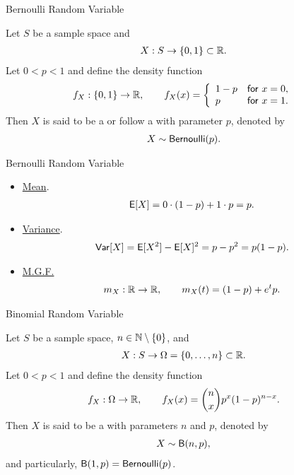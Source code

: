 \begin{frame}{Bernoulli Random Variable}

\justifying
{} Let $S$ be a sample space and 
\begin{align*}
X: S \rightarrow \{0, 1\} \subset \mathbb{R}.
\end{align*}
Let $0 < p < 1$ and define the density function
\begin{align*}
f_X: \{0, 1\} \rightarrow \mathbb{R}, \qquad f_X(x) = \left\{
\begin{array}{ll}
1 - p & \mathsf{for\ } x = 0, \\
p & \mathsf{for\ } x = 1.
\end{array}
\right.
\end{align*}
Then $X$ is said to be a  or follow a  with parameter $p$, denoted by
\begin{align*}
X\sim \mathsf{Bernoulli}(p).
\end{align*}

\end{frame}

\begin{frame}{Bernoulli Random Variable}

\justifying
{}
\begin{itemize}
	\justifying
	\item \underline{Mean}.
	\begin{align*}
	\mathsf{E}[X] = 0\cdot (1-p) + 1\cdot p = p.
	\end{align*}
	\item \underline{Variance}.
	\begin{align*}
	\mathsf{Var}[X] = \mathsf{E}[X^2] - \mathsf{E}[X]^2 = p - p^2 = p(1-p).
	\end{align*}
	\item \underline{M.G.F.}
	\begin{align*}
	m_X: \mathbb{R}\rightarrow \mathbb{R}, \qquad m_X(t) = (1-p) + e^tp.
	\end{align*}
\end{itemize}

\end{frame}

\begin{frame}{Binomial Random Variable}

\justifying
{} Let $S$ be a sample space, $n\in \mathbb{N} \setminus \{0\}$, and
\begin{align*}
X: S\rightarrow \Omega = \{0, \ldots, n\} \subset \mathbb{R}.
\end{align*}
Let $0 < p < 1$ and define the density function
\begin{align*}
f_X: \Omega \rightarrow \mathbb{R}, \qquad f_X(x) = \binom{n}{x} p^x(1-p)^{n-x}.
\end{align*}
Then $X$ is said to be a  with parameters $n$ and $p$, denoted by
\begin{align*}
X\sim \mathsf{B}(n, p),
\end{align*}
and particularly, $\mathsf{B}(1, p) = \mathsf{Bernoulli}(p)$.

\end{frame}

